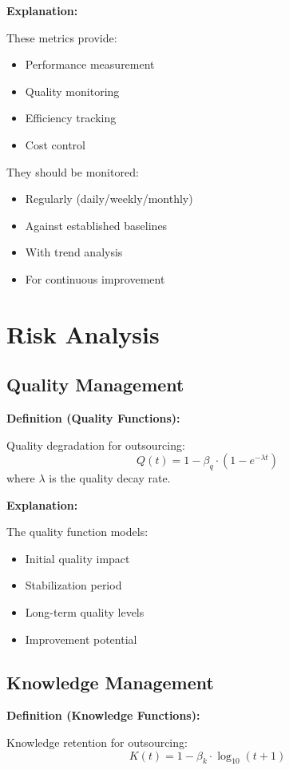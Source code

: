 \documentclass[12pt,a4paper]{article}
\newenvironment{definition}[1]
{\begin{mdframed}[style=definitionstyle]
\textbf{Definition (#1):}\par}
{\end{mdframed}}
\newenvironment{explanation}
{\begin{mdframed}[style=explanationstyle]
\textbf{Explanation:}\par}
{\end{mdframed}}
\begin{document}
\begin{explanation}
These metrics provide:
\begin{itemize}
    \item Performance measurement
    \item Quality monitoring
    \item Efficiency tracking
    \item Cost control
\end{itemize}

They should be monitored:
\begin{itemize}
    \item Regularly (daily/weekly/monthly)
    \item Against established baselines
    \item With trend analysis
    \item For continuous improvement
\end{itemize}
\end{explanation}

\section{Risk Analysis}
\subsection{Quality Management}
\begin{definition}{Quality Functions}
Quality degradation for outsourcing:
\begin{equation}
    Q(t) = 1 - \beta_q \cdot (1 - e^{-\lambda t})
\end{equation}
where $\lambda$ is the quality decay rate.
\end{definition}

\begin{explanation}
The quality function models:
\begin{itemize}
    \item Initial quality impact
    \item Stabilization period
    \item Long-term quality levels
    \item Improvement potential
\end{itemize}
\end{explanation}

\subsection{Knowledge Management}
\begin{definition}{Knowledge Functions}
Knowledge retention for outsourcing:
\begin{equation}
    K(t) = 1 - \beta_k \cdot \log_{10}(t + 1)
\end{equation}
\end{definition}
\end{document}
